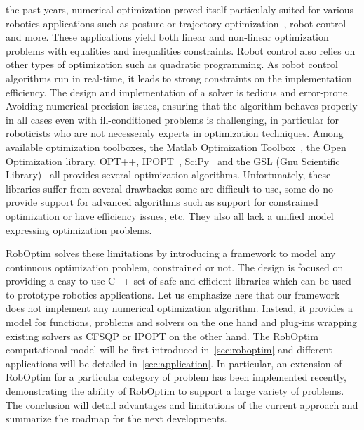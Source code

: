 \documentclass[conference,final,a4paper,twocolumn,9pt]{IEEEtran}
\begin{document}
 the past years, numerical optimization proved
itself particulaly suited for various robotics applications such as
posture or trajectory optimization~\cite{miossec06,saab-tro-12}, robot
control~\cite{mansard-icra-12} and more. These applications yield both
linear and non-linear optimization problems with equalities and
inequalities constraints. Robot control also relies on other types of
optimization such as quadratic programming. As robot control
algorithms run in real-time, it leads to strong constraints on the
implementation efficiency. The design and implementation of a solver
is tedious and error-prone. Avoiding numerical precision issues,
ensuring that the algorithm behaves properly in all cases even with
ill-conditioned problems is challenging, in particular for roboticists
who are not necesseraly experts in optimization techniques. Among
available optimization toolboxes, the Matlab Optimization
Toolbox~\cite{matlab}, the Open Optimization library, OPT++,
IPOPT~\cite{ipopt}, SciPy~\cite{scipy} and the GSL (Gnu Scientific
Library)~\cite{gsl} all provides several optimization
algorithms. Unfortunately, these libraries suffer from several
drawbacks: some are difficult to use, some do no provide support for
advanced algorithms such as support for constrained optimization or
have efficiency issues, etc. They also all lack a unified model
expressing optimization problems.


RobOptim solves these limitations by introducing a framework to model
any continuous optimization problem, constrained or not. The design is
focused on providing a easy-to-use C++ set of safe and efficient
libraries which can be used to prototype robotics applications.  Let
us emphasize here that our framework does not implement any numerical
optimization algorithm. Instead, it provides a model for functions,
problems and solvers on the one hand and plug-ins wrapping existing
solvers as CFSQP or IPOPT on the other hand.  The RobOptim
computational model will be first introduced in~\autoref{sec:roboptim}
and different applications will be detailed
in~\autoref{sec:application}. In particular, an extension of RobOptim
for a particular category of problem has been implemented recently,
demonstrating the ability of RobOptim to support a large variety of
problems. The conclusion will detail advantages and limitations of the
current approach and summarize the roadmap for the next developments.
\end{document}
